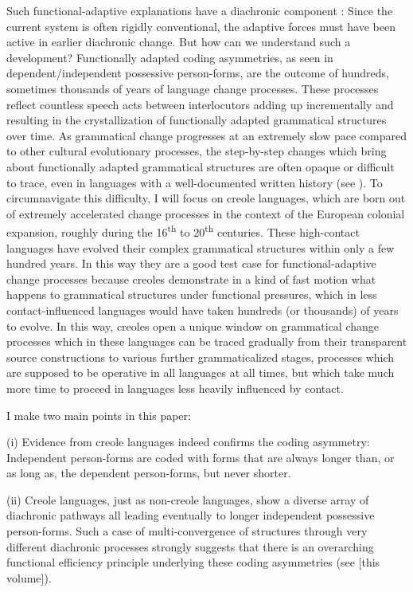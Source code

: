 \documentclass[output=paper]{langsci/langscibook}
\begin{document}
Such functional-adaptive explanations have a diachronic component \citep{Bybee1988}: Since the current system is often rigidly conventional, the adaptive forces must have been active in earlier diachronic change. But how can we understand such a development? Functionally adapted coding asymmetries, as seen in dependent/independent possessive person-forms, are the outcome of hundreds, sometimes thousands of years of language change processes. These processes reflect countless speech acts between interlocutors adding up incrementally and resulting in the crystallization of functionally adapted grammatical structures over time. As grammatical change progresses at an extremely slow pace compared to other cultural evolutionary processes, the step-by-step changes which bring about functionally adapted grammatical structures are often opaque or difficult to trace, even in languages with a well-documented written history (see ). To circumnavigate this difficulty, I will focus on creole languages, which are born out of extremely accelerated change processes in the context of the European colonial expansion, roughly during the 16\textsuperscript{th} to 20\textsuperscript{th} centuries. These high-contact languages have evolved their complex grammatical structures within only a few hundred years. In this way they are a good test case for functional-adaptive change processes because creoles demonstrate in a kind of fast motion what happens to grammatical structures under functional pressures, which in less contact-influenced languages would have taken hundreds (or thousands) of years to evolve. In this way, creoles open a unique window on grammatical change processes which in these languages can be traced gradually from their transparent source constructions to various further grammaticalized stages, processes which are supposed to be operative in all languages at all times, but which take much more time to proceed in languages less heavily influenced by contact. 

I make two main points in this paper:

(i) Evidence from creole languages indeed confirms the coding asymmetry: Independent person-forms are coded with forms that are always longer than, or as long as, the dependent person-forms, but never shorter.

(ii) Creole languages, just as non-creole languages, show a diverse array of diachronic pathways all leading eventually to longer independent possessive person-forms. Such a case of multi-convergence of structures through very different diachronic processes strongly suggests that there is an overarching functional efficiency principle underlying these coding asymmetries (see \citealt{Haspelmath2018} [this volume]). 
\end{document}
